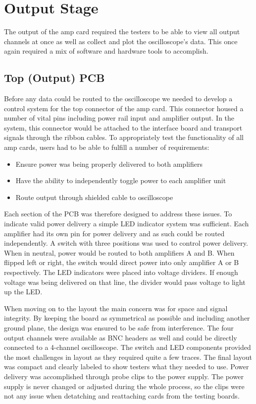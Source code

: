 \section{Output Stage}
The output of the amp card required the testers to be able to view all output channels at once as well as collect and plot the oscilloscope's data. This once again required a mix of software and hardware tools to accomplish.
\subsection{Top (Output) PCB}
Before any data could be routed to the oscilloscope we needed to develop a control system for the top connector of the amp card. This connector housed a number of vital pins including power rail input and amplifier output. In the system, this connector would be attached to the interface board and transport signals through the ribbon cables. To appropriately test the functionality of all amp cards, users had to be able to fulfill a number of requirements:
\begin{itemize}
	\item Ensure power was being properly delivered to both amplifiers
	\item Have the ability to independently toggle power to each amplifier unit
	\item Route output through shielded cable to oscilloscope
\end{itemize}
Each section of the PCB was therefore designed to address these issues. To indicate valid power delivery a simple LED indicator system was sufficient. Each amplifier had its own pin for power delivery and as such could be routed independently. A switch with three positions was used to control power delivery. When in neutral, power would be routed to both amplifiers A and B. When flipped left or right, the switch would direct power into only amplifier A or B respectively. The LED indicators were placed into voltage dividers. If enough voltage was being delivered on that line, the divider would pass voltage to light up the LED. \par
When moving on to the layout the main concern was for space and signal integrity. By keeping the board as symmetrical as possible and including another ground plane, the design was ensured to be safe from interference. The four output channels were available as BNC headers as well and could be directly connected to a 4-channel oscilloscope. The switch and LED components provided the most challenges in layout as they required quite a few traces. The final layout was compact and clearly labeled to show testers what they needed to use. Power delivery was accomplished through probe clips to the power supply. The power supply is never changed or adjusted during the whole process, so the clips were not any issue when detatching and reattaching cards from the testing boards.

